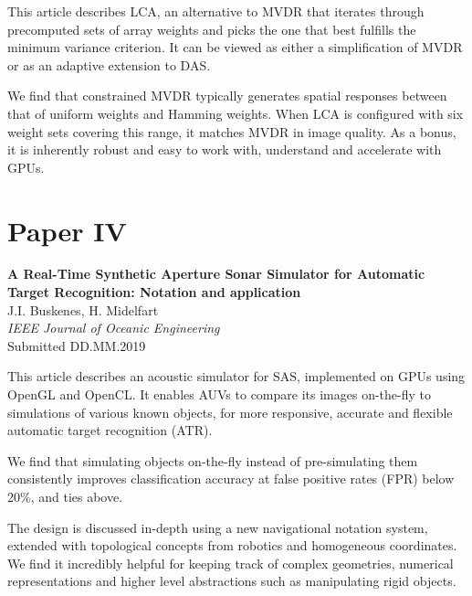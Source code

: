 This article describes LCA, an alternative to MVDR that iterates through precomputed sets of array weights and picks the one that best fulfills the minimum variance criterion. It can be viewed as either a simplification of MVDR or as an adaptive extension to DAS.

We find that constrained MVDR typically generates spatial responses between that of uniform weights and Hamming weights. When LCA is configured with six weight sets covering this range, it matches MVDR in image quality. As a bonus, it is inherently robust and easy to work with, understand and accelerate with GPUs.



\section{Paper IV}\label{sec:paperIV} %
\textbf{A Real-Time Synthetic Aperture Sonar Simulator for Automatic Target Recognition: Notation and application}\\
J.I. Buskenes, H. Midelfart\\
\textit{IEEE Journal of Oceanic Engineering}\\
Submitted DD.MM.2019%

This article describes an acoustic simulator for SAS, implemented on GPUs using OpenGL and OpenCL. It enables AUVs to compare its images on-the-fly to simulations of various known objects, for more responsive, accurate and flexible automatic target recognition (ATR).

We find that simulating objects on-the-fly instead of pre-simulating them consistently improves classification accuracy at false positive rates (FPR) below 20\%, and ties above. 

The design is discussed in-depth using a new navigational notation system, extended with topological concepts from robotics and homogeneous coordinates. We find it incredibly helpful for keeping track of complex geometries, numerical representations and higher level abstractions such as manipulating rigid objects. 




%
%
%






